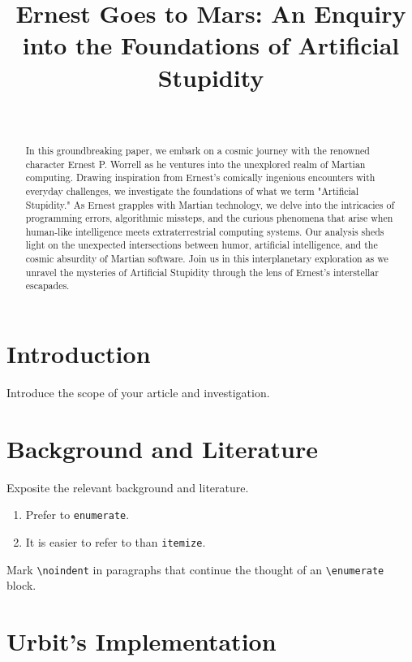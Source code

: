 \documentclass[twoside]{article}
\title{Ernest Goes to Mars:  An Enquiry into the Foundations of Artificial Stupidity}
\author{\authorname~\authorpatp \\ \affiliation}
\date{}
\begin{document}
\maketitle
\thispagestyle{firststyle}

\begin{abstract}
In this groundbreaking paper, we embark on a cosmic journey with the renowned character Ernest P. Worrell as he ventures into the unexplored realm of Martian computing. Drawing inspiration from Ernest's comically ingenious encounters with everyday challenges, we investigate the foundations of what we term "Artificial Stupidity." As Ernest grapples with Martian technology, we delve into the intricacies of programming errors, algorithmic missteps, and the curious phenomena that arise when human-like intelligence meets extraterrestrial computing systems. Our analysis sheds light on the unexpected intersections between humor, artificial intelligence, and the cosmic absurdity of Martian software. Join us in this interplanetary exploration as we unravel the mysteries of Artificial Stupidity through the lens of Ernest's interstellar escapades.
\end{abstract}

\setcounter{page}{1}

\tableofcontents

\section{Introduction}

Introduce the scope of your article and investigation.

\section{Background and Literature}

Exposite the relevant background and literature.

\begin{enumerate}
  \item  Prefer to \texttt{enumerate}.
  \item  It is easier to refer to than \texttt{itemize}.
\end{enumerate}

\noindent
Mark \texttt{\textbackslash noindent} in paragraphs that continue the thought of an \texttt{\textbackslash enumerate} block.

\section{Urbit's Implementation}
\end{document}
